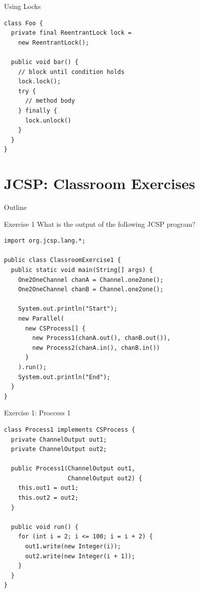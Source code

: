 \begin{frame}[fragile]{Using Locks}
  \begin{lstlisting}
class Foo {
  private final ReentrantLock lock = 
    new ReentrantLock();

  public void bar() {
    // block until condition holds
    lock.lock();
    try {
      // method body
    } finally {
      lock.unlock()
    }
  }
}
\end{lstlisting}
\end{frame}


\section{JCSP: Classroom Exercises}

\begin{frame}{Outline}
  \tableofcontents[current]
\end{frame}

\begin{frame}[fragile]{Exercise 1}
  What is the output of the following JCSP program?


\begin{lstlisting}[basicstyle=\fontsize{9}{11}\selectfont\ttfamily]
import org.jcsp.lang.*;

public class ClassroomExercise1 {
  public static void main(String[] args) {
    One2OneChannel chanA = Channel.one2one();
    One2OneChannel chanB = Channel.one2one();

    System.out.println("Start");
    new Parallel(
      new CSProcess[] { 
        new Process1(chanA.out(), chanB.out()),
        new Process2(chanA.in(), chanB.in()) 
      }
    ).run();
    System.out.println("End");
  }
}
\end{lstlisting}
\end{frame}

\begin{frame}[fragile]{Exercise 1: Proccess 1}
\begin{lstlisting}[basicstyle=\fontsize{9}{11}\selectfont\ttfamily]
class Process1 implements CSProcess {
  private ChannelOutput out1;
  private ChannelOutput out2;

  public Process1(ChannelOutput out1, 
                  ChannelOutput out2) {
    this.out1 = out1;
    this.out2 = out2;
  }

  public void run() {
    for (int i = 2; i <= 100; i = i + 2) {
      out1.write(new Integer(i));
      out2.write(new Integer(i + 1));
    }
  }
}
\end{lstlisting}
\end{frame}

